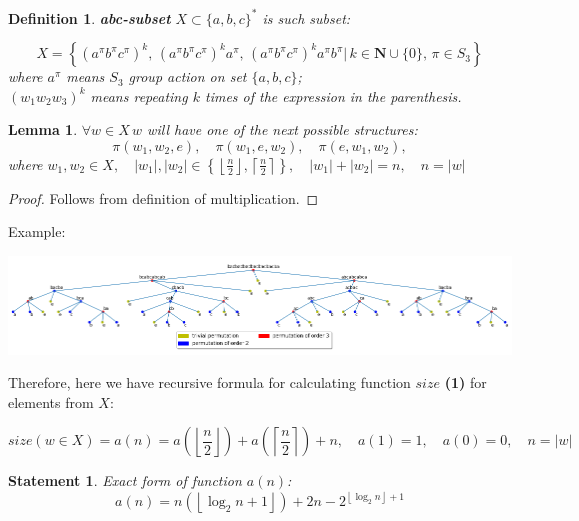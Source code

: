 \documentclass{article}
\newtheorem{definition}{Definition}[section]
\newtheorem{statement}{Statement}[section]
\newtheorem{lemma}[theorem]{Lemma}
\begin{document}
\begin{definition}
	\textbf{abc-subset} $X \subset  \{a, b, c\}^*$ is such subset: 
	
	\begin{equation}
		 X = \left\{ (a^\pi b^\pi c^\pi)^k, \, (a^\pi b^\pi c^\pi)^k a^\pi, \, (a^\pi b^\pi c^\pi)^k a^\pi b^\pi  |\, k \in \mathbf{N}\cup\{0\}, \, \pi \in S_3   \right\}
	\end{equation}
	where $a^\pi$ means $S_3$ group action on set $\{a, b, c\}$; \\
	$(w_1 w_2 w_3)^k$ means repeating $k$ times of the expression in the parenthesis.
	\\
	
\end{definition}

\begin{lemma}
	$\forall w \in X \, w$ will have one of the next possible structures:
	$$\pi (w_1, w_2, e), \quad \pi(w_1, e, w_2), \quad \pi(e, w_1, w_2), $$
	where $w_1, w_2 \in X, \quad |w_1|, |w_2| \in
	\left\{
	\left\lfloor
	\frac{n}{2}
	\right\rfloor,
	\left\lceil
	\frac{n}{2}
	\right\rceil
	\right\}, \quad |w_1| + |w_2| = n, \quad n = |w|$
	\\
\end{lemma}

\begin{proof}
	Follows from definition of multiplication.
\end{proof}

Example: 

\includegraphics[scale=0.5]{../graphs/max_size_tree.png}

Therefore, here we have recursive formula for calculating function $size$ \textbf{(1)} for elements from $X$:

$$size(w \in X) = a (n) = a \left(
    \left\lfloor
        \frac{n}{2}
    \right\rfloor
\right)
+ a \left(
    \left\lceil
        \frac{n}{2}
    \right\rceil
\right) + n, \quad a(1) = 1, \quad a(0) = 0, \quad n = |w|
$$

\begin{statement}
	Exact form of function $a(n)$:
	\begin{equation}
		 a(n) = n \left(\left\lfloor \log_2 n + 1 \right\rfloor\right) + 2n - 2^{\left\lfloor\log_2 n\right\rfloor + 1}
	\end{equation}
\end{statement}
\end{document}
